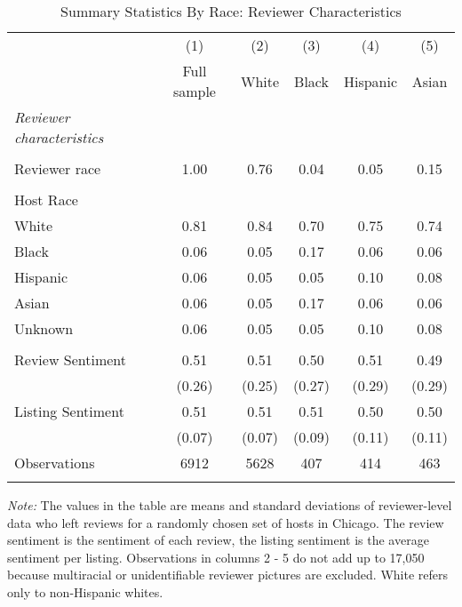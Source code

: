 \begin{table}[htbp]
\caption{Summary Statistics By Race: Reviewer Characteristics}
\begin{center}%
\small\begin{tabular}{l c c c c c}
 \cmidrule(r){1-6}
 & (1) & (2) & (3) & (4) & (5)
\\
 & \multicolumn{1}{c}{Full sample} & White & Black & Hispanic & Asian
\\
\hline\hline\noalign{\smallskip} 
 \textit{Reviewer characteristics} & & & & & \\ \hline \\ Reviewer race & 1.00 & 0.76 & 0.04 & 0.05 & 0.15 \\\\
Host Race &&&&& \\ \hspace{10bp}White & 0.81 & 0.84 & 0.70 & 0.75 & 0.74 \\ \hspace{10bp}Black & 0.06 & 0.05 & 0.17 & 0.06 & 0.06 \\ \hspace{10bp}Hispanic & 0.06 & 0.05 & 0.05 & 0.10 & 0.08 \\ \hspace{10bp}Asian & 0.06 & 0.05 & 0.17 & 0.06 & 0.06 \\ \hspace{10bp}Unknown & 0.06 & 0.05 & 0.05 & 0.10 & 0.08 \\\\
 Review Sentiment & 0.51 & 0.51 & 0.50 & 0.51 & 0.49 \\
 & (0.26) & (0.25) & (0.27) & (0.29) & (0.29) \\
 Listing Sentiment & 0.51 & 0.51 & 0.51 & 0.50 & 0.50 \\
 & (0.07) & (0.07) & (0.09) & (0.11) & (0.11) \\
\hline
Observations & 6912 & 5628 & 407 & 414 & 463
\\
\hline\hline\noalign{\smallskip} \end{tabular} 
\begin{minipage}{6in}
{\it Note:} The values in the table are means and standard deviations of reviewer-level data who left reviews for a randomly chosen set of hosts in Chicago. The review sentiment is the sentiment of each review, the listing sentiment is the average sentiment per listing. Observations in columns 2 - 5 do not add up to 17,050 because multiracial or unidentifiable reviewer pictures are excluded. White refers only to non-Hispanic whites.
\end{minipage}
\end{center}
\end{table}
